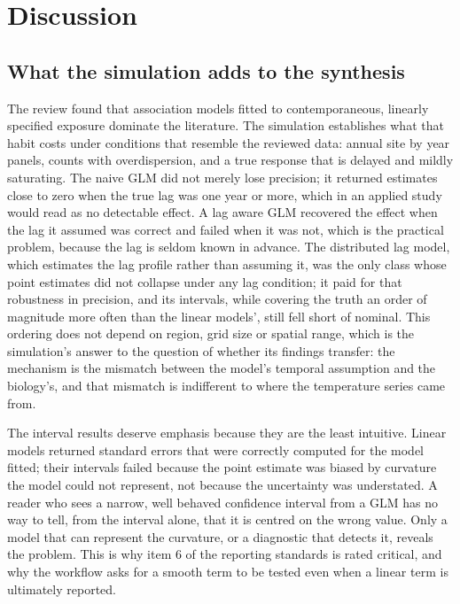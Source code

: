 \section{Discussion}\label{sec:discussion}

\subsection{What the simulation adds to the synthesis}

The review found that association models fitted to contemporaneous, linearly specified exposure dominate the literature. The simulation establishes what that habit costs under conditions that resemble the reviewed data: annual site by year panels, counts with overdispersion, and a true response that is delayed and mildly saturating. The naive GLM did not merely lose precision; it returned estimates close to zero when the true lag was one year or more, which in an applied study would read as no detectable effect. A lag aware GLM recovered the effect when the lag it assumed was correct and failed when it was not, which is the practical problem, because the lag is seldom known in advance. The distributed lag model, which estimates the lag profile rather than assuming it, was the only class whose point estimates did not collapse under any lag condition; it paid for that robustness in precision, and its intervals, while covering the truth an order of magnitude more often than the linear models', still fell short of nominal. This ordering does not depend on region, grid size or spatial range, which is the simulation's answer to the question of whether its findings transfer: the mechanism is the mismatch between the model's temporal assumption and the biology's, and that mismatch is indifferent to where the temperature series came from.

The interval results deserve emphasis because they are the least intuitive. Linear models returned standard errors that were correctly computed for the model fitted; their intervals failed because the point estimate was biased by curvature the model could not represent, not because the uncertainty was understated. A reader who sees a narrow, well behaved confidence interval from a GLM has no way to tell, from the interval alone, that it is centred on the wrong value. Only a model that can represent the curvature, or a diagnostic that detects it, reveals the problem. This is why item 6 of the reporting standards is rated critical, and why the workflow asks for a smooth term to be tested even when a linear term is ultimately reported.

